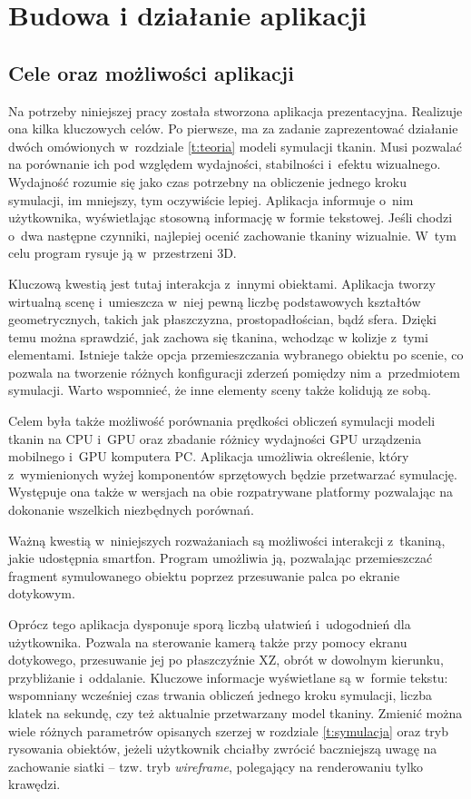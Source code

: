 \chapter{Budowa i działanie aplikacji}
\label{t:praktyka}
	
	\section{Cele oraz możliwości aplikacji}
	\label{t:praktyka:cel}
	
	
	Na potrzeby niniejszej pracy została stworzona aplikacja prezentacyjna. Realizuje ona kilka kluczowych celów. Po pierwsze, ma za zadanie zaprezentować działanie dwóch omówionych w~rozdziale \ref{t:teoria} modeli symulacji tkanin. Musi pozwalać na porównanie ich pod względem wydajności, stabilności i~efektu wizualnego. Wydajność rozumie się jako czas potrzebny na obliczenie jednego kroku symulacji, im mniejszy, tym oczywiście lepiej. Aplikacja informuje o~nim użytkownika, wyświetlając stosowną informację w formie tekstowej. Jeśli chodzi o~dwa następne czynniki, najlepiej ocenić zachowanie tkaniny wizualnie. W~tym celu program rysuje ją w~przestrzeni 3D. 
	
	Kluczową kwestią jest tutaj interakcja z~innymi obiektami. Aplikacja tworzy wirtualną scenę i~umieszcza w~niej pewną liczbę podstawowych kształtów geometrycznych, takich jak płaszczyzna, prostopadłościan, bądź sfera. Dzięki temu można sprawdzić, jak zachowa się tkanina, wchodząc w kolizje z~tymi elementami. Istnieje także opcja przemieszczania wybranego obiektu po scenie, co pozwala na tworzenie różnych konfiguracji zderzeń pomiędzy nim a~przedmiotem symulacji. Warto wspomnieć, że inne elementy sceny także kolidują ze sobą.
	
	Celem była także możliwość porównania prędkości obliczeń symulacji modeli tkanin na CPU i~GPU oraz zbadanie różnicy wydajności GPU urządzenia mobilnego i~GPU komputera PC. Aplikacja umożliwia określenie, który z~wymienionych wyżej komponentów sprzętowych będzie przetwarzać symulację. Występuje ona także w wersjach na obie rozpatrywane platformy pozwalając na dokonanie wszelkich niezbędnych porównań.
	
	Ważną kwestią w~niniejszych rozważaniach są możliwości interakcji z~tkaniną, jakie udostępnia smartfon. Program umożliwia ją, pozwalając przemieszczać fragment symulowanego obiektu poprzez przesuwanie palca po ekranie dotykowym.
	
	Oprócz tego aplikacja dysponuje sporą liczbą ułatwień i~udogodnień dla użytkownika. Pozwala na sterowanie kamerą także przy pomocy ekranu dotykowego, przesuwanie jej po płaszczyźnie XZ, obrót w dowolnym kierunku, przybliżanie i~oddalanie. Kluczowe informacje wyświetlane są w~formie tekstu: wspomniany wcześniej czas trwania obliczeń jednego kroku symulacji, liczba klatek na sekundę, czy też aktualnie przetwarzany model tkaniny. Zmienić można wiele różnych parametrów opisanych szerzej w rozdziale \ref{t:symulacja} oraz tryb rysowania obiektów, jeżeli użytkownik chciałby zwrócić baczniejszą uwagę na zachowanie siatki -- tzw. tryb \emph{wireframe}, polegający na renderowaniu tylko krawędzi.
	

